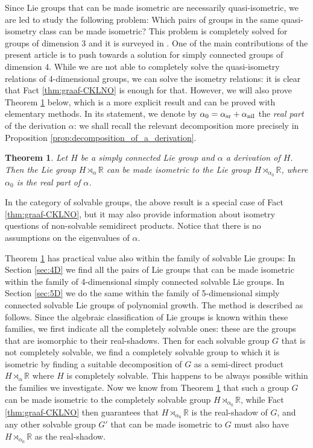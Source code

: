 \documentclass[a4paper,12pt]{amsart}
\theoremstyle{plain}
\theoremstyle{definition}
\theoremstyle{plain}
\newtheorem{lausea}{Theorem}
\theoremstyle{remark}
\begin{document}
Since Lie groups that can be made isometric are necessarily quasi-isometric, we are led to study the following problem: Which pairs of groups in the same quasi-isometry class can be made isometric? 
This problem is completely solved for groups of dimension 3 and it is surveyed in \cite{avain:fasslerledonne}.
One of the main contributions of the present article is to push towards a solution for simply connected groups of dimension 4. While we are not able to completely solve the quasi-isometry relations of 4-dimensional groups, we can solve the isometry relations: it is clear that Fact \ref{thm:graaf-CKLNO} is enough for that. However, we will also prove Theorem \ref{thm:alkup_yleinen} below, which is a more explicit result and can be proved with elementary methods. In its statement, we denote by \( \alpha_0 =\alpha_\mathrm{sr} +  \alpha_\mathrm{nil}  \) the \emph{real part} of the derivation \( \alpha \): we shall recall the relevant decomposition more precisely in Proposition \ref{prop:decomposition_of_a_derivation}.

\begin{lausea} \label{thm:alkup_yleinen}
	Let \( H \) be a simply connected Lie group and \( \alpha \) a derivation of \( H\). 
	Then the Lie group \(  H \rtimes_{\alpha} \mathbb{R} \) can be made isometric to the Lie group \(  H \rtimes_{\alpha_0} \mathbb{R} \), where \( \alpha_0 \) is the real part of \( \alpha \).
\end{lausea}

In the category of solvable groups, the above result is a special case of Fact \ref{thm:graaf-CKLNO}, but it may also provide information about isometry questions of non-solvable semidirect products. Notice that there is no assumptions on the eigenvalues of \( \alpha \).

Theorem \ref{thm:alkup_yleinen} has practical value also within the family of solvable Lie groups:
In Section \ref{sec:4D} we find all the pairs of Lie groups that can be made isometric within the family of 4-dimensional simply connected solvable Lie groups.
In Section \ref{sec:5D} we do the same within the family of 5-dimensional simply connected solvable Lie groups of polynomial growth.
The method is described as follows. Since the algebraic classification of Lie groups is known within these families, we first indicate all the completely solvable ones: these are the groups that are isomorphic to their real-shadows. Then for each solvable group  \( G\) that is not completely solvable, we find a completely solvable group to which it is isometric by finding a suitable decomposition of \( G\) as a semi-direct product \( H \rtimes_\alpha \mathbb{R} \) where \( H \) is completely solvable. This happens to be always possible within the families we investigate. Now we know from Theorem \ref{thm:alkup_yleinen} that such a group \( G \) can be made isometric to the completely solvable group \( H \rtimes_{\alpha_0} \mathbb{R} \), while Fact \ref{thm:graaf-CKLNO} then guarantees that \( H \rtimes_{\alpha_0} \mathbb{R} \) is the real-shadow of \( G \), and any other solvable group \( G' \) that can be made isometric to \( G \) must also have \( H \rtimes_{\alpha_0} \mathbb{R} \) as the real-shadow.
\end{document}
